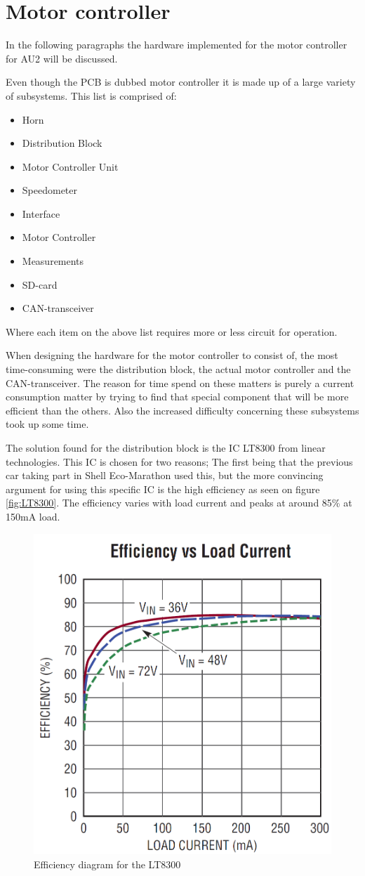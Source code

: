\section{Motor controller}
In the following paragraphs the hardware implemented for the motor controller for AU2 will be discussed. 

Even though the PCB is dubbed motor controller it is made up of a large variety of subsystems. This list is comprised of: 

\begin{itemize}
	\item{Horn}
	\item{Distribution Block}
	\item{Motor Controller Unit}
	\item{Speedometer}
	\item{Interface}
	\item{Motor Controller}
	\item{Measurements}
	\item{SD-card}
	\item{CAN-transceiver}
\end{itemize}

Where each item on the above list requires more or less circuit for operation. 

When designing the hardware for the motor controller to consist of, the most time-consuming were the distribution block, the actual motor controller and the CAN-transceiver. The reason for time spend on these matters is purely a current consumption matter by trying to find that special component that will be more efficient than the others. Also the increased difficulty concerning these subsystems took up some time. 

The solution found for the distribution block is the IC LT8300\cite{LT8300} from linear technologies. This IC is chosen for two reasons; The first being that the previous car taking part in Shell Eco-Marathon used this, but the more convincing argument for using this specific IC is the high efficiency as seen on figure \vref{fig:LT8300}. The efficiency varies with load current and peaks at around 85\% at 150mA load.  

\begin{figure}[H]
	\centering
	\includegraphics[width=0.5\linewidth]{Hardware/Pictures/LT8300}
	\caption{Efficiency diagram for the LT8300}
	\label{fig:LT8300}
\end{figure}

